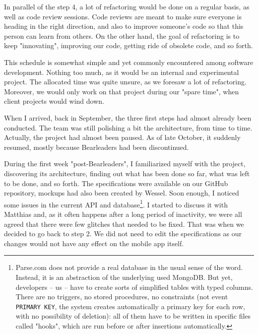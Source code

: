 \medskip

In parallel of the step 4, a lot of refactoring would be done on a regular basis, as well as code review sessions. Code reviews are meant to make sure everyone is heading in the right direction, and also to improve someone's code so that this person can learn from others. On the other hand, the goal of refactoring is to keep "innovating", improving our code, getting ride of obsolete code, and so forth.

\medskip

This schedule is somewhat simple and yet commonly encountered among software development. Nothing too much, as it would be an internal and experimental project. The allocated time was quite unsure, as we foresaw a lot of refactoring. Moreover, we would only work on that project during our "spare time", when client projects would wind down.

\medskip

When I arrived, back in September, the three first steps had almost already been conducted. The team was still polishing a bit the architecture, from time to time. Actually, the project had almost been paused. As of late October, it suddenly resumed, mostly because Bearleaders had been discontinued.

\medskip

During the first week "post-Bearleaders", I familiarized myself with the project, discovering its architecture, finding out what has been done so far, what was left to be done, and so forth. The specifications were available on our GitHub repository, mockups had also been created by Wessel. Soon enough, I noticed some issues in the current API and database\footnote{Parse.com does not provide a real database in the usual sense of the word. Instead, it is an abstraction of the underlying used MongoDB. But yet, developers -- us -- have to create sorts of simplified tables with typed columns. There are no triggers, no stored procedures, no constraints (not event \lstinline{PRIMARY KEY}, the system creates automatically a primary key for each row, with no possibility of deletion): all of them have to be written in specific files called "hooks", which are run before or after insertions automatically.}. I started to discuss it with Matthias and, as it often happens after a long period of inactivity, we were all agreed that there were few glitches that needed to be fixed. That was when we decided to go back to step 2. We did not need to edit the specifications as our changes would not have any effect on the mobile app itself.

